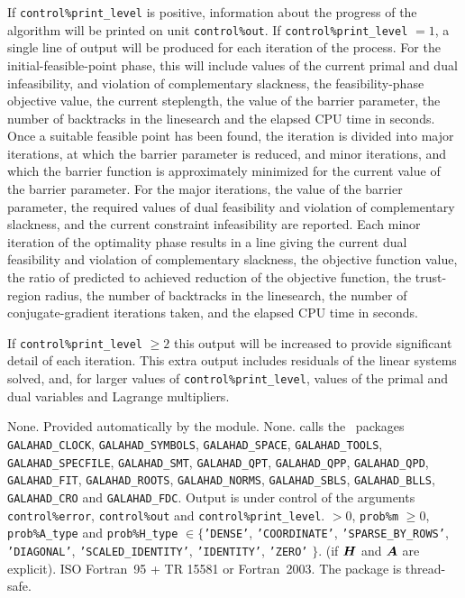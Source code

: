 \documentclass{galahad}
\newcommand{\packagename}{CQP}
\begin{document}

\galinfo
If {\tt control\%print\_level} is positive, information about the progress
of the algorithm will be printed on unit {\tt control\-\%out}.
If {\tt control\%print\_level} $= 1$, a single line of output will be produced
for each iteration of the process.
For the initial-feasible-point phase,
this will include values of the current primal and dual infeasibility, and
violation of complementary slackness, the feasibility-phase objective value,
the current steplength, the value of the barrier parameter, the
number of backtracks in the linesearch and the elapsed CPU time in seconds.
Once a suitable feasible point has been found, the iteration is divided
into major iterations, at which the barrier parameter is reduced, and
minor iterations, and which the barrier function is approximately minimized
for the current value of the barrier parameter. For the major iterations,
the value of the barrier parameter, the required values of
dual feasibility and violation of complementary slackness, and the current
constraint infeasibility are reported. Each minor iteration of the
optimality phase results in a line giving
the current dual feasibility and violation of complementary slackness, the
objective function value, the ratio of predicted to achieved reduction
of the objective function, the trust-region radius, the
number of backtracks in the linesearch, the number of conjugate-gradient
iterations taken, and the elapsed CPU time in seconds.

If {\tt control\%print\_level} $\geq 2$ this
output will be increased to provide significant detail of each iteration.
This extra output includes residuals of the linear systems solved, and,
for larger values of {\tt control\%print\_level}, values of the primal and dual
variables and Lagrange multipliers.


\galgeneral

\galcommon None.
\galworkspace Provided automatically by the module.
\galroutines None.
\galmodules {\tt \packagename\_solve} calls the \galahad\ packages
{\tt GALAHAD\_CLOCK},
{\tt GALAHAD\_SY\-M\-BOLS},
{\tt GALA\-HAD\_SPACE},
{\tt GAL\-AHAD\_TOOLS},
{\tt GALAHAD\_SPECFILE},
{\tt GALAHAD\_SMT},
{\tt GALAHAD\_QPT},
{\tt GALAHAD\_QPP},
{\tt GALAHAD\_QPD},
{\tt GALAHAD\_FIT},
{\tt GALAHAD\_ROOTS},
{\tt GALAHAD\_NORMS},
{\tt GALAHAD\_SBLS},
{\tt GALAHAD\_BLLS},
{\tt GALAHAD\_CRO}
and
{\tt GAL\-AHAD\_FDC}.
\galio Output is under control of the arguments
 {\tt control\%error}, {\tt control\%out} and {\tt control\%print\_level}.
 $> 0$, {\tt prob\%m} $\geq  0$,
{\tt prob\%A\_type} and {\tt prob\%H\_type} $\in \{${\tt 'DENSE'},
 {\tt 'COORDINATE'}, {\tt 'SPARSE\_BY\_\-ROWS'}, {\tt 'DIAGONAL'},
 {\tt 'SCALED\_IDENTITY'}, {\tt 'IDENTITY'}, {\tt 'ZERO'} $\}$.
(if ${\bm{H}}$ and ${\bm{A}}$ are explicit).
\galportability ISO Fortran~95 + TR 15581 or Fortran~2003.
The package is thread-safe.
\end{document}
